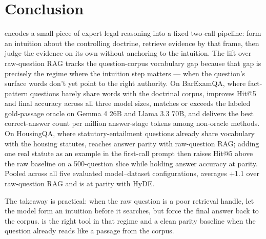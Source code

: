 \section{Conclusion}\label{sec:conclusion}

\hyre{} encodes a small piece of expert legal reasoning into a fixed two-call
pipeline: form an intuition about the controlling doctrine, retrieve evidence
by that frame, then judge the evidence on its own without anchoring to the
intuition. The lift over raw-question RAG tracks the question-corpus
vocabulary gap because that gap is precisely the regime where the intuition
step matters --- when the question's surface words don't yet point to the
right authority. On BarExamQA, where fact-pattern questions barely share
words with the doctrinal corpus, \hyre{} improves Hit@5 and final accuracy
across all three model sizes, matches or exceeds the labeled gold-passage
oracle on Gemma 4 26B and Llama 3.3 70B, and delivers the best correct-answer
count per million answer-stage tokens among non-oracle methods. On
HousingQA, where statutory-entailment questions already share vocabulary
with the housing statutes, \hyre{} reaches answer parity with raw-question
RAG; adding one real statute as an example in the first-call prompt then
raises Hit@5 above the raw baseline on a 500-question slice while holding
answer accuracy at parity. Pooled across all five evaluated model--dataset
configurations, \hyre{} averages +1.1\pp{} over raw-question RAG and is at
parity with HyDE.

The takeaway is practical: when the raw question is a poor retrieval handle,
let the model form an intuition before it searches, but force the final
answer back to the corpus. \hyre{} is the right tool in that regime and a
clean parity baseline when the question already reads like a passage from
the corpus.
